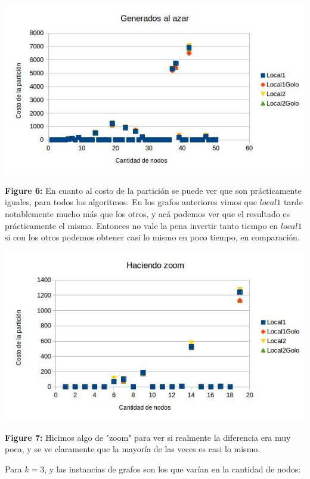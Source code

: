 \documentclass[a4paper]{article}
\begin{document}
\includegraphics[width=\textwidth,height=\textheight,keepaspectratio
]{KaleN1-50Suma.jpg}
\begin {flushleft}
\textbf{Figure 6:} En cuanto al costo de la partición se puede ver que son prácticamente iguales, para todos los algoritmos. En los grafos anteriores vimos que $local1$ tarde notablemente mucho más que los otros, y acá podemos ver que el resultado es prácticamente el mismo. Entonces no vale la pena invertir tanto tiempo en $local1$ si con los otros podemos obtener casi lo mismo en poco tiempo, en comparación.
\end{flushleft}

\includegraphics[width=\textwidth,height=\textheight,keepaspectratio
]{KaleN1-50SumaZoom.jpg}
\begin {flushleft}
\textbf{Figure 7:} Hicimos algo de "zoom" para ver si realmente la diferencia era muy poca, y se ve claramente que la mayoría de las veces es casi lo mismo.
\end{flushleft}

Para $k=3$, y las instancias de grafos son los que varían en la cantidad de nodos:
\end{document}
